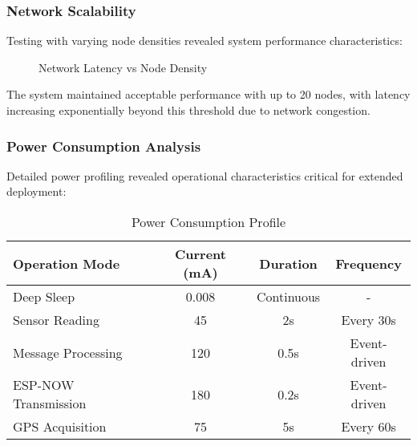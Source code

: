 \documentclass[conference]{IEEEtran}
\begin{document}
\subsubsection{Network Scalability}

Testing with varying node densities revealed system performance characteristics:

\begin{figure}[htbp]
\centering
{}
\caption{Network Latency vs Node Density}
\label{fig:scalability}
\end{figure}

The system maintained acceptable performance with up to 20 nodes, with latency increasing exponentially beyond this threshold due to network congestion.

\subsubsection{Power Consumption Analysis}

Detailed power profiling revealed operational characteristics critical for extended deployment:

\begin{table}[htbp]
\centering
\caption{Power Consumption Profile}
\label{tab:power_consumption}
\begin{tabular}{|l|c|c|c|}
\hline
\textbf{Operation Mode} & \textbf{Current (mA)} & \textbf{Duration} & \textbf{Frequency} \\
\hline
Deep Sleep & 0.008 & Continuous & - \\
\hline
Sensor Reading & 45 & 2s & Every 30s \\
\hline
Message Processing & 120 & 0.5s & Event-driven \\
\hline
ESP-NOW Transmission & 180 & 0.2s & Event-driven \\
\hline
GPS Acquisition & 75 & 5s & Every 60s \\
\hline
\end{tabular}
\end{table}
\end{document}
